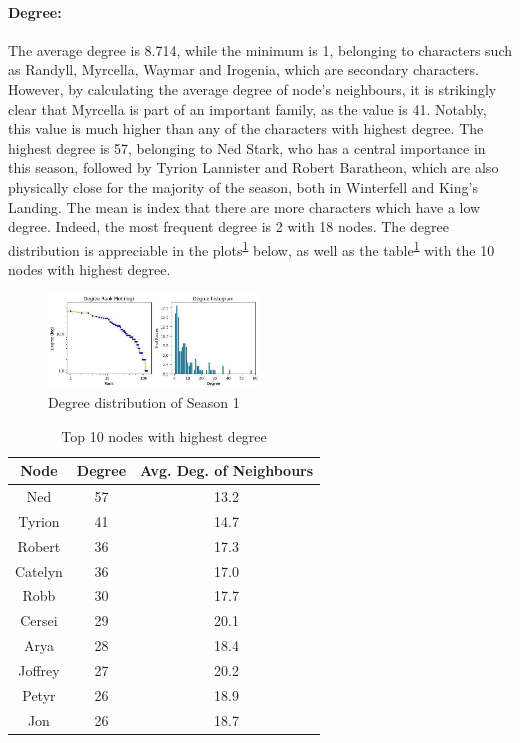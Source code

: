 \documentclass[10pt,twocolumn,letterpaper]{article}
\begin{document}
\paragraph{Degree:}

The average degree is 8.714, while the minimum is 1, belonging to characters such as Randyll, Myrcella, Waymar and Irogenia, which are secondary characters. However, by calculating the average degree of node's neighbours, it is strikingly clear that Myrcella is part of an important family, as the value is 41. Notably, this value is much higher than any of the characters with highest degree. 
The highest degree is 57, belonging to Ned Stark, who has a central importance in this season, followed by Tyrion Lannister and Robert Baratheon, which are also physically close for the majority of the season, both in Winterfell and King's Landing. The mean is index that there are more characters which have a low degree. Indeed, the most frequent degree is 2 with 18 nodes. The degree distribution is appreciable in the plots\textsuperscript{\ref{fig:degplot_s1}} below, as well as the table\textsuperscript{\ref{tab:deg_s1}} with the 10 nodes with highest degree.

\begin{figure}[!h]
    \centering
    \includegraphics[width=0.5\textwidth]{img/s1/degree_plot.jpg}
    \caption{\small{Degree distribution of Season 1}}
    \label{fig:degplot_s1}
\end{figure}

\begin{table}[!h]
    \centering
    \small
    \begin{tabular}{c|c|c}
        Node & Degree & \small{Avg. Deg. of Neighbours}  \\
        \hline
         Ned  &  57 & 13.2 \\
         Tyrion & 41 & 14.7 \\
        Robert & 36 & 17.3 \\
        Catelyn  & 36 & 17.0 \\
        Robb  & 30 & 17.7 \\
        Cersei  & 29 & 20.1 \\
        Arya  & 28 & 18.4 \\
        Joffrey  & 27 & 20.2 \\
        Petyr  & 26 & 18.9 \\
        Jon  & 26 & 18.7 \\
        \hline 
    \end{tabular} \\
    \caption{Top 10 nodes with highest degree}
    \label{tab:deg_s1}
\end{table}
\end{document}
